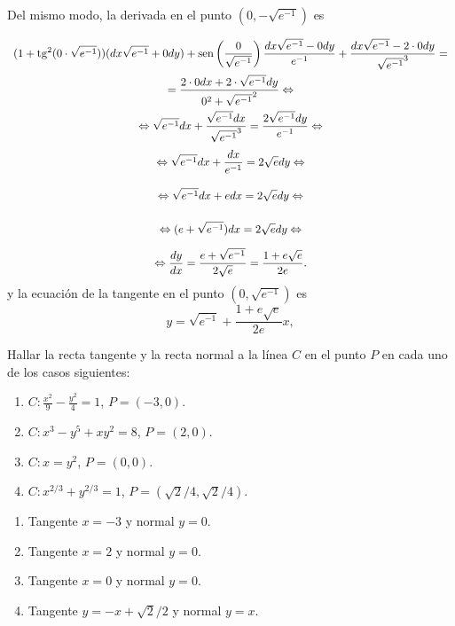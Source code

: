 {Del mismo modo, la derivada en el punto $(0,-\sqrt{e^{-1}})$ es 
\[
\renewcommand{\arraystretch}{2.5}
\begin{array}{c} \displaystyle
(1+\tg^2(0\cdot \sqrt{e^{-1}}))(dx\sqrt{e^{-1}}+0dy)+\sen\left(\frac{0}{\sqrt{e^{-1}}}\right)\frac{dx\sqrt{e^{-1}}-0dy}{e^{-1}}+\frac{dx\sqrt{e^{-1}}-2\cdot 0dy}{\sqrt{e^{-1}}^3}= \\ \displaystyle
= \frac{2\cdot 0dx+2\cdot\sqrt{e^{-1}}dy}{0^2+\sqrt{e^{-1}}^2} \Leftrightarrow\\ \displaystyle
\Leftrightarrow \sqrt{e^{-1}}dx+\frac{\sqrt{e^{-1}}dx}{\sqrt{e^{-1}}^3} =
\frac{2\sqrt{e^{-1}}dy}{e^{-1}} \Leftrightarrow\\ \displaystyle
\Leftrightarrow \sqrt{e^{-1}}dx+\frac{dx}{e^{-1}} =
2\sqrt{e}dy \Leftrightarrow\\ \displaystyle
\Leftrightarrow \sqrt{e^{-1}}dx+edx = 2\sqrt{e}dy \Leftrightarrow\\ \displaystyle
\Leftrightarrow (e+\sqrt{e^{-1}})dx = 2\sqrt{e}dy \Leftrightarrow\\ \displaystyle
\Leftrightarrow \frac{dy}{dx} = \frac{e+\sqrt{e^{-1}}}{2\sqrt{e}} = \frac{1+e\sqrt{e}}{2e}.
\end{array}
\]
y la ecuación de la tangente en el punto  $(0,\sqrt{e^{-1}})$ es
\[
y = \sqrt{e^{-1}} + \frac{1+e\sqrt{e}}{2e} x,
\]
}


{Hallar la recta tangente y la recta normal a la línea $C$ en el punto $P$ en cada uno de los casos siguientes:
\begin{enumerate}
\item $\displaystyle C:\frac{x^2}{9}-\frac{y^2}{4}=1$, $P=(-3,0)$.
\item $C:x^3-y^5+xy^2 = 8$, $P=(2,0)$.
\item $C:x=y^2$, $P=(0,0)$.
\item $C:x^{2/3}+y^{2/3}=1$, $P=(\sqrt2/4,\sqrt2/4)$.
\end{enumerate}
}
{\begin{enumerate}
\item Tangente $x=-3$ y normal $y=0$.
\item Tangente $x=2$ y normal $y=0$.
\item Tangente $x=0$ y normal $y=0$.
\item Tangente $y=-x+\sqrt{2}/2$ y normal $y=x$.
\end{enumerate}
}
{
}


